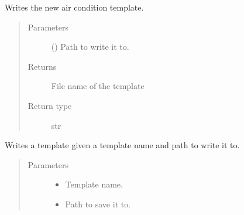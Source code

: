 \documentclass[letterpaper,10pt,english]{sphinxmanual}
\begin{document}
\begin{fulllineitems}
\label{\detokenize{lib:livestock.lib.templates.new_air_conditions}}
Writes the new air condition template.
\begin{quote}\begin{description}
\item[{Parameters}] \leavevmode
{} () \textendash{} Path to write it to.

\item[{Returns}] \leavevmode
File name of the template

\item[{Return type}] \leavevmode
str

\end{description}\end{quote}

\end{fulllineitems}


\begin{fulllineitems}
\label{\detokenize{lib:livestock.lib.templates.pick_template}}
Writes a template given a template name and path to write it to.
\begin{quote}\begin{description}
\item[{Parameters}] \leavevmode\begin{itemize}
\item {} 
 \textendash{} Template name.

\item {} 
 \textendash{} Path to save it to.

\end{itemize}

\end{description}\end{quote}

\end{fulllineitems}

\end{document}
